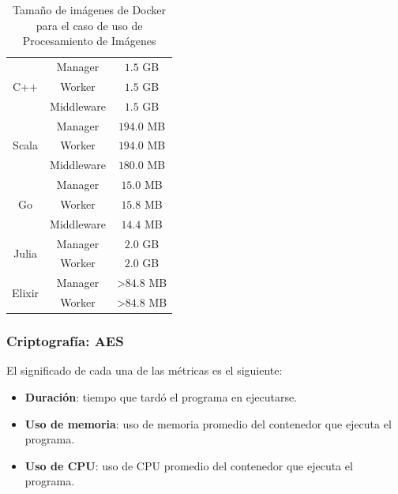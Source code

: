 \documentclass[11pt]{article}
\let\Oldsubsubsection\subsubsection
\renewcommand{\subsubsection}{\FloatBarrier\Oldsubsubsection}
\begin{document}
\begin{table}[H]
\centering
\begin{tabular}{|ccc|}
\hline
\multicolumn{1}{|c|}{\multirow{3}{*}{C++}} & \multicolumn{1}{c|}{Manager} & $1.5$ GB \\ \cline{2-3} 
\multicolumn{1}{|c|}{} & \multicolumn{1}{c|}{Worker} & $1.5$ GB \\ \cline{2-3} 
\multicolumn{1}{|c|}{} & \multicolumn{1}{c|}{Middleware} & $1.5$ GB \\ \hline
\multicolumn{1}{|c|}{\multirow{3}{*}{Scala}} & \multicolumn{1}{c|}{Manager} & $194.0$ MB \\ \cline{2-3} 
\multicolumn{1}{|c|}{} & \multicolumn{1}{c|}{Worker} & $194.0$ MB \\ \cline{2-3} 
\multicolumn{1}{|c|}{} & \multicolumn{1}{c|}{Middleware} & $180.0$ MB \\ \hline
\multicolumn{1}{|c|}{\multirow{3}{*}{Go}} & \multicolumn{1}{c|}{Manager} & $15.0$ MB \\ \cline{2-3} 
\multicolumn{1}{|c|}{} & \multicolumn{1}{c|}{Worker} & $15.8$ MB \\ \cline{2-3} 
\multicolumn{1}{|c|}{} & \multicolumn{1}{c|}{Middleware} & $14.4$ MB \\ \hline
\multicolumn{1}{|c|}{\multirow{2}{*}{Julia}} & \multicolumn{1}{c|}{Manager} & $2.0$ GB \\ \cline{2-3} 
\multicolumn{1}{|c|}{} & \multicolumn{1}{c|}{Worker} & $2.0$ GB \\ \hline
\multicolumn{1}{|c|}{\multirow{2}{*}{Elixir}} & \multicolumn{1}{c|}{Manager} & \textgreater{}$84.8$ MB \\ \cline{2-3} 
\multicolumn{1}{|c|}{} & \multicolumn{1}{c|}{Worker} & \textgreater{}$84.8$ MB \\ \hline
\end{tabular}
\caption{Tamaño de imágenes de Docker para el caso de uso de Procesamiento de Imágenes}
\label{tab:ip:image_sizes}
\end{table}

\subsubsection{Criptografía: AES} \label{sec:anex:metrics:aes}

El significado de cada una de las métricas es el siguiente:

\begin{itemize}
    \item \textbf{Duración}: tiempo que tardó el programa en ejecutarse.
    \item \textbf{Uso de memoria}: uso de memoria promedio del contenedor que ejecuta el programa.
    \item \textbf{Uso de CPU}: uso de CPU promedio del contenedor que ejecuta el programa.
\end{itemize}
\end{document}
